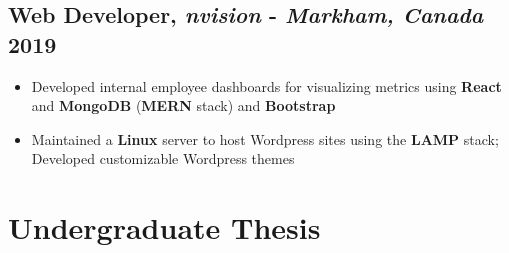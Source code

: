 \documentclass[9pt]{article}
\begin{document}
\subsection{Web Developer, \textit{nvision} - \normalsize\textit{Markham, Canada} \hfill \normalsize\textnormal{2019}}
\begin{itemize}
  \item Developed internal employee dashboards for visualizing metrics using \textbf{React} and \textbf{MongoDB} (\textbf{MERN} stack) and \textbf{Bootstrap} 
  \item Maintained a \textbf{Linux} server to host Wordpress sites using the \textbf{LAMP} stack; Developed customizable Wordpress themes
\end{itemize}




\section*{Undergraduate Thesis}
\end{document}
